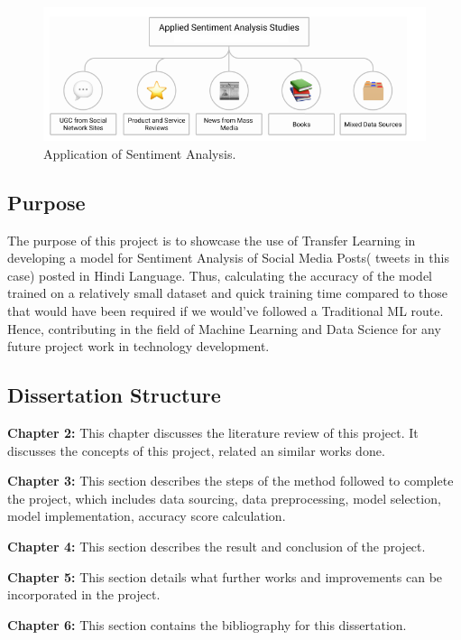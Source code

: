 \documentclass[a4paper, 12pt]{article}
\begin{document}
\begin{sloppypar}
\begin{figure}[H]
\begin{center}
\includegraphics[scale=0.7]{cat.png}
\caption{Application of Sentiment Analysis. \cite{smetanin_applications_2020} \label{cat}}
\end{center}
\end{figure}

\subsection{Purpose}

The purpose of this project is to showcase the use of Transfer Learning in developing a model for Sentiment Analysis of Social Media Posts( tweets in this case) posted in Hindi Language. Thus, calculating the accuracy of the model trained on a relatively small dataset and quick training time compared to those that would have been required if we would've followed a Traditional ML route. Hence, contributing in the field of Machine Learning and Data Science for any future project work in technology development.

\subsection{Dissertation Structure}
\textbf{Chapter 2:} This chapter discusses the literature review of this project. It discusses the concepts of this project, related an similar works done.

\textbf{Chapter 3:} This section describes the steps of the method followed to complete the project, which includes data sourcing, data preprocessing, model selection, model implementation, accuracy score calculation.

\textbf{Chapter 4:} This section describes the result and conclusion of the project.

\textbf{Chapter 5:} This section details what further works and improvements can be incorporated in the project.

\textbf{Chapter 6:} This section contains the bibliography for this dissertation.
\clearpage


\end{sloppypar}
\end{document}
